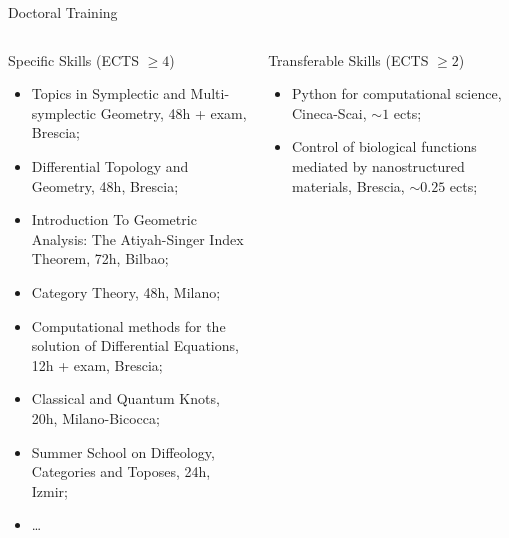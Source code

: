 \documentclass[handout,10pt]{beamer}
\begin{document}
\begin{frame}[shrink]{Doctoral Training}
\begin{columns}
	\begin{column}{.50\linewidth}
	\begin{exampleblock}{	\textbf{\CheckedBox} Specific Skills (ECTS $\geq 4$)}
		\begin{itemize}%
			\item Topics in Symplectic and Multi-symplectic Geometry, 48h + exam, Brescia;
			\item Differential Topology and Geometry, 48h, Brescia;
			\item Introduction To Geometric Analysis: The Atiyah-Singer Index Theorem, 72h, Bilbao;
			\item Category Theory, 48h, Milano;
			\item Computational methods for the solution of Differential Equations, 12h + exam, Brescia;
			\item Classical and Quantum Knots, 20h, Milano-Bicocca;
			\item Summer School on Diffeology, Categories and Toposes, 24h, Izmir;
			\item \ldots		
		\end{itemize}
	\end{exampleblock}	
  \end{column}
	\begin{column}{.50\linewidth}
	\begin{exampleblock}{	\textbf{\CheckedBox} Transferable Skills (ECTS $\geq 2$)}
		\begin{itemize}%
			\item Python for computational science, Cineca-Scai, $\sim 1$ ects;
			\item Control of biological functions mediated by nanostructured materials, Brescia, $\sim 0.25$ ects;

\end{itemize}
\end{exampleblock}
\end{column}
\end{columns}
\end{frame}
\end{document}
